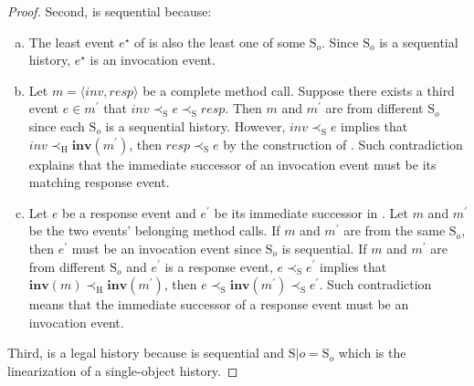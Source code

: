 \documentclass[a4paper,USenglish]{lipics-v2016}
\newcommand{\linz}{linearization}
\newcommand{\myinv}{\textbf{inv}}
\newcommand{\his}{\text{H}}
\newcommand{\shis}{\text{S}}
\newcommand{\myvert}{\vert}
\begin{document}
\begin{proof}
	Second, {\shis} is sequential because:
	\begin{enumerate}[(a)]
		\item
		The least event $e^\star$ of {\shis} is also the least one of some $\shis_o$.
		Since $\shis_o$ is a sequential history, $e^\star$ is an invocation event.
		\item
		Let $m = \langle inv, resp \rangle$ be a complete method call.
		Suppose there exists a third event $e \in m^\prime$ that $inv \prec_{\shis} e \prec_{\shis} resp$.
		Then $m$ and $m^\prime$ are from different $\shis_o$ since each $\shis_o$ is a sequential history.
		However, $inv \prec_{\shis} e$ implies that $inv \prec_{\his} \myinv(m^\prime)$, then $resp \prec_{\shis} e$ by the construction of {\shis}.
		Such contradiction explains that the immediate successor of an invocation event must be its matching response event.
		\item
		Let $e$ be a response event and $e^\prime$ be its immediate successor in {\shis}.
		Let $m$ and $m^\prime$ be the two events' belonging method calls.
		If $m$ and $m^\prime$ are from the same $\shis_o$, then $e^\prime$ must be an invocation event since $\shis_o$ is sequential.
		If $m$ and $m^\prime$ are from different $\shis_o$ and $e^\prime$ is a response event,
		$e \prec_{\shis} e^\prime$ implies that $\myinv(m) \prec_{\his} \myinv(m^\prime)$,
		then $e \prec_{\shis} \myinv(m^\prime) \prec_{\shis} e^\prime$.
		Such contradiction means that the immediate successor of a response event must be an invocation event.
	\end{enumerate}
	
	Third, {\shis} is a legal history because {\shis} is sequential and $\shis \myvert o = \shis_o$ which is the {\linz} of a single-object history.
	

\end{proof}
\end{document}
